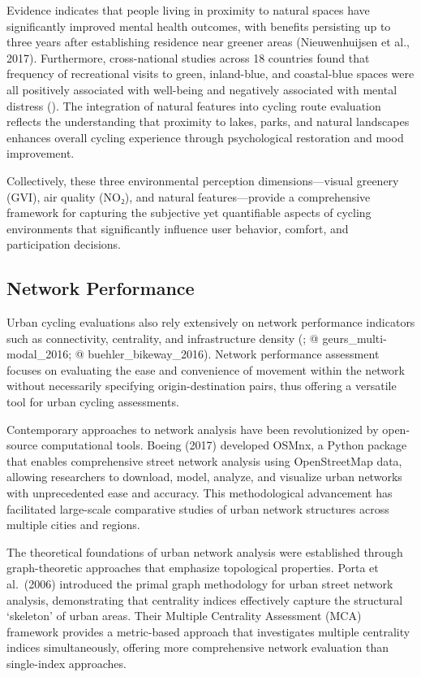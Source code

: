 \documentclass[
  12pt,
  oneside]{book}
\begin{document}
Evidence indicates that people living in proximity to natural spaces have significantly improved mental health outcomes, with benefits persisting up to three years after establishing residence near greener areas (Nieuwenhuijsen et al., 2017). Furthermore, cross-national studies across 18 countries found that frequency of recreational visits to green, inland-blue, and coastal-blue spaces were all positively associated with well-being and negatively associated with mental distress (\textcite{hooyberg_general_2020}). The integration of natural features into cycling route evaluation reflects the understanding that proximity to lakes, parks, and natural landscapes enhances overall cycling experience through psychological restoration and mood improvement.

Collectively, these three environmental perception dimensions---visual greenery (GVI), air quality (NO₂), and natural features---provide a comprehensive framework for capturing the subjective yet quantifiable aspects of cycling environments that significantly influence user behavior, comfort, and participation decisions.

\subsection{Network Performance}\label{network-performance}

Urban cycling evaluations also rely extensively on network performance indicators such as connectivity, centrality, and infrastructure density (\textcite{lowry_assessment_2012}; @ geurs\_multi-modal\_2016; @ buehler\_bikeway\_2016). Network performance assessment focuses on evaluating the ease and convenience of movement within the network without necessarily specifying origin-destination pairs, thus offering a versatile tool for urban cycling assessments.

Contemporary approaches to network analysis have been revolutionized by open-source computational tools. Boeing (2017) developed OSMnx, a Python package that enables comprehensive street network analysis using OpenStreetMap data, allowing researchers to download, model, analyze, and visualize urban networks with unprecedented ease and accuracy. This methodological advancement has facilitated large-scale comparative studies of urban network structures across multiple cities and regions.

The theoretical foundations of urban network analysis were established through graph-theoretic approaches that emphasize topological properties. Porta et al.~(2006) introduced the primal graph methodology for urban street network analysis, demonstrating that centrality indices effectively capture the structural `skeleton' of urban areas. Their Multiple Centrality Assessment (MCA) framework provides a metric-based approach that investigates multiple centrality indices simultaneously, offering more comprehensive network evaluation than single-index approaches.
\end{document}
